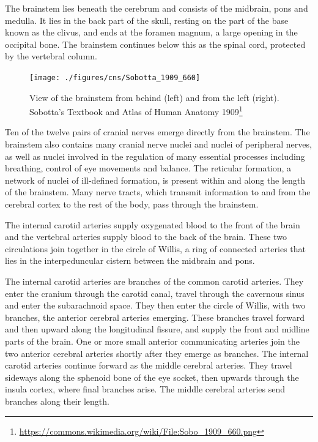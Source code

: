 \documentclass[]{book}
\let\rmarkdownfootnote\footnote%
\def\footnote{\protect\rmarkdownfootnote}
\renewcommand{\href}[2]{#2\footnote{\url{#1}}}
\begin{document}
The brainstem lies beneath the cerebrum and consists of the midbrain, pons and medulla. It lies in the back part of the skull, resting on the part of the base known as the clivus, and ends at the foramen magnum, a large opening in the occipital bone. The brainstem continues below this as the spinal cord, protected by the vertebral column.



\begin{figure}

{\centering \texttt{[image: ./figures/cns/Sobotta\_1909\_660]} 

}

\caption{View of the brainstem from behind (left) and from the left (right). \href{https://commons.wikimedia.org/wiki/File:Sobo_1909_660.png}{Sobotta's Textbook and Atlas of Human Anatomy 1909}}\label{fig:quadrigemina}
\end{figure}

Ten of the twelve pairs of cranial nerves emerge directly from the brainstem. The brainstem also contains many cranial nerve nuclei and nuclei of peripheral nerves, as well as nuclei involved in the regulation of many essential processes including breathing, control of eye movements and balance. The reticular formation, a network of nuclei of ill-defined formation, is present within and along the length of the brainstem. Many nerve tracts, which transmit information to and from the cerebral cortex to the rest of the body, pass through the brainstem.

The internal carotid arteries supply oxygenated blood to the front of the brain and the vertebral arteries supply blood to the back of the brain. These two circulations join together in the circle of Willis, a ring of connected arteries that lies in the interpeduncular cistern between the midbrain and pons.

The internal carotid arteries are branches of the common carotid arteries. They enter the cranium through the carotid canal, travel through the cavernous sinus and enter the subarachnoid space. They then enter the circle of Willis, with two branches, the anterior cerebral arteries emerging. These branches travel forward and then upward along the longitudinal fissure, and supply the front and midline parts of the brain. One or more small anterior communicating arteries join the two anterior cerebral arteries shortly after they emerge as branches. The internal carotid arteries continue forward as the middle cerebral arteries. They travel sideways along the sphenoid bone of the eye socket, then upwards through the insula cortex, where final branches arise. The middle cerebral arteries send branches along their length.
\end{document}
